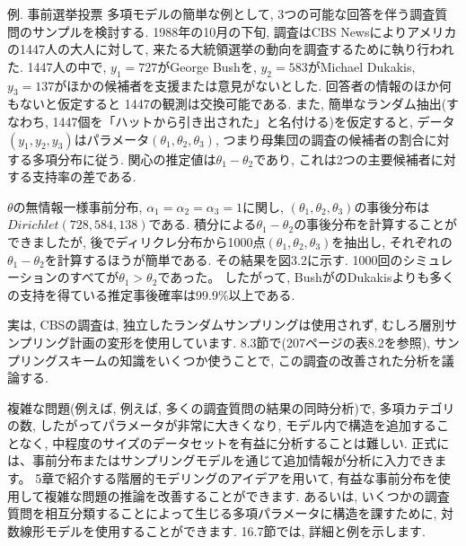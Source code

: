\documentclass[10pt,dvipdfmx,a4]{beamer}
\begin{document}

\begin{frame}{例. 事前選挙投票}
多項モデルの簡単な例として, 3つの可能な回答を伴う調査質問のサンプルを検討する.
1988年の10月の下旬, 調査はCBS Newsによりアメリカの1447人の大人に対して, 来たる大統領選挙の動向を調査するために執り行われた.
1447人の中で, $y_1=727$がGeorge Bushを, $y_2=583$がMichael Dukakis, $y_3=137$がほかの候補者を支援または意見がないとした.
回答者の情報のほか何もないと仮定すると 1447の観測は交換可能である.
また, 簡単なランダム抽出(すなわち, 1447個を「ハットから引き出された」と名付ける)を仮定すると, データ$(y_1,y_2,y_3)$はパラメータ$(\theta_1,\theta_2,\theta_3)$, つまり母集団の調査の候補者の割合に対する多項分布に従う.
関心の推定値は$\theta_1-\theta_2$であり, これは2つの主要候補者に対する支持率の差である.

$\theta$の無情報一様事前分布, $\alpha_1=\alpha_2=\alpha_3=1$に関し, $(\theta_1, \theta_2, \theta_3)$の事後分布は$Dirichlet(728,584,138)$である.
積分による$\theta_1-\theta_2$の事後分布を計算することができましたが, 後でディリクレ分布から1000点$(\theta_1,\theta_2,\theta_3)$を抽出し, それぞれの$\theta_1-\theta_2$を計算するほうが簡単である.
その結果を図3.2に示す.
1000回のシミュレーションのすべてが$\theta_1>\theta_2$であった。
したがって, BushがのDukakisよりも多くの支持を得ている推定事後確率は99.9\%以上である.
\end{frame}


\begin{frame}
実は, CBSの調査は, 独立したランダムサンプリングは使用されず, むしろ層別サンプリング計画の変形を使用しています.
8.3節で(207ページの表8.2を参照), サンプリングスキームの知識をいくつか使うことで, この調査の改善された分析を議論する.

複雑な問題(例えば, 例えば, 多くの調査質問の結果の同時分析)で, 多項カテゴリの数, したがってパラメータが非常に大きくなり, モデル内で構造を追加することなく, 中程度のサイズのデータセットを有益に分析することは難しい.
正式には、事前分布またはサンプリングモデルを通じて追加情報が分析に入力できます。
5章で紹介する階層的モデリングのアイデアを用いて, 有益な事前分布を使用して複雑な問題の推論を改善することができます.
あるいは, いくつかの調査質問を相互分類することによって生じる多項パラメータに構造を課すために, 対数線形モデルを使用することができます.
16.7節では, 詳細と例を示します.
\end{frame}

\end{document}
